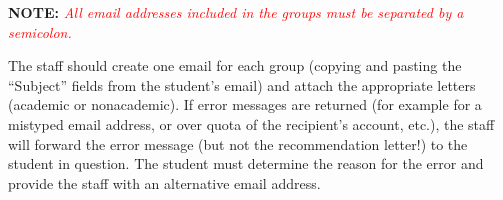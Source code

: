 \documentclass{econtex}
\begin{document}
\begin{enumerate}
\textbf{NOTE:} \textcolor{red}{\textit{All email addresses included in the groups must be separated by a semicolon.}}

\normalsize

The staff should create one email for each group (copying and pasting
the ``Subject'' fields from the student's email) and attach
the appropriate letters (academic or nonacademic).  If error
messages are returned (for example for a mistyped email address, or
over quota of the recipient's account, etc.), the staff will forward
the error message (but not the recommendation letter!) to the student
in question. The student must determine the reason for the error and
provide the staff with an alternative email address.



\end{enumerate}
\end{document}
